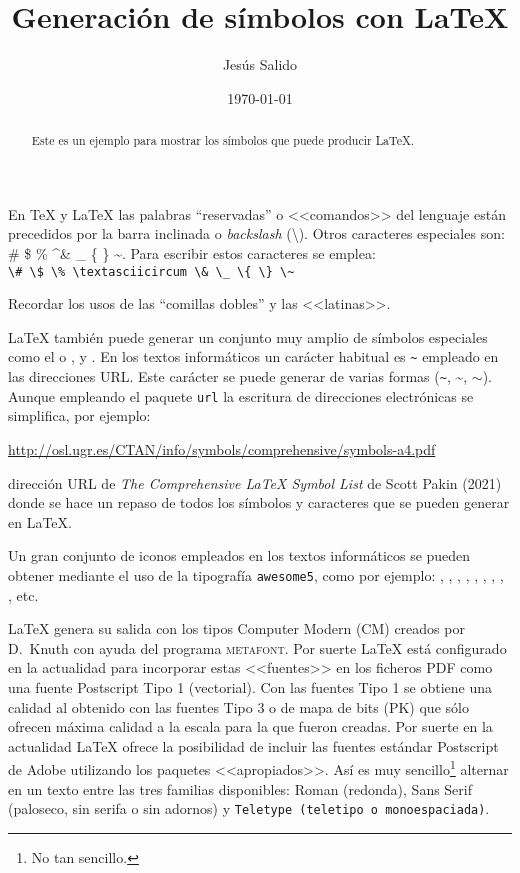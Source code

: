 \documentclass[11pt,a4paper]{article}
\title{Generación de símbolos con \LaTeX}
\author{Jesús Salido}
\date{\today}
\begin{document}
\maketitle


\begin{abstract}
	Este es un ejemplo para mostrar los símbolos que puede producir \LaTeX.
\end{abstract}



En \TeX{} y \LaTeX{} las palabras ``reservadas'' o <<comandos>> del lenguaje están precedidos por la barra inclinada o \emph{backslash} (\textbackslash). Otros caracteres especiales son: \# \$ \% \textasciicircum \& \_ \{ \} \~{}. Para escribir estos caracteres se emplea:\\
\verb!\# \$ \% \textasciicircum \& \_ \{ \} \~!

Recordar los usos de las ``comillas dobles'' y las <<latinas>>.

\LaTeX{} también puede generar un conjunto muy amplio de símbolos 
especiales como el \EUR{} o \texteuro,  y \Coffeecup. En los 
textos informáticos un carácter habitual es \verb+~+ empleado en las 
direcciones URL. Este carácter se puede generar de varias formas (\verb+~+, 
\~{}, $\sim$). Aunque empleando el paquete \texttt{url} la escritura de 
direcciones electrónicas se simplifica, por ejemplo:

\url{http://osl.ugr.es/CTAN/info/symbols/comprehensive/symbols-a4.pdf}

\noindent dirección URL de \emph{The Comprehensive \LaTeX{} Symbol List} de Scott Pakin (2021) donde se hace un repaso de todos los símbolos y caracteres que se pueden generar en \LaTeX{}.

Un gran conjunto de iconos empleados en los textos informáticos se pueden 
obtener mediante el uso de la tipografía \texttt{awesome5}, como por 
ejemplo: \faNodeJs, \faNode, \faGooglePlay, \faInternetExplorer, \faGithub, 
\faGit*, \faWhatsapp, , , etc. 


\LaTeX{} genera su salida con los tipos Computer Modern (CM) creados por D.~Knuth con ayuda del programa \textsc{metafont}. Por suerte \LaTeX{} está configurado en la actualidad para incorporar estas <<fuentes>> en los ficheros PDF como una fuente Postscript Tipo 1 (vectorial). Con las fuentes Tipo 1 se obtiene una calidad al obtenido con las fuentes Tipo 3 o de mapa de bits (PK) que sólo ofrecen máxima calidad a la escala para la que fueron creadas. Por suerte en la actualidad \LaTeX{} ofrece la posibilidad de incluir las fuentes estándar Postscript de Adobe utilizando los paquetes <<apropiados>>. Así es muy sencillo\footnote{No tan sencillo.} alternar en un texto entre las tres familias disponibles: Roman (redonda), \textsf{Sans Serif (paloseco, sin serifa o sin adornos)} y \texttt{Teletype (teletipo o monoespaciada)}.
\end{document}
